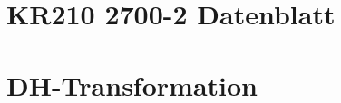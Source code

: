 \section{KR210 2700-2 Datenblatt}
\label{add:datenblatt}

%
\setcounter{chapter}{2}
\setcounter{section}{1}
\setcounter{table}{0}
\setcounter{figure}{0}
%
\section{DH-Transformation}
\label{add:dh}

%
\setcounter{chapter}{2}
\setcounter{section}{2}
\setcounter{table}{0}
\setcounter{figure}{0}
%
\label{add:systemparameter}
